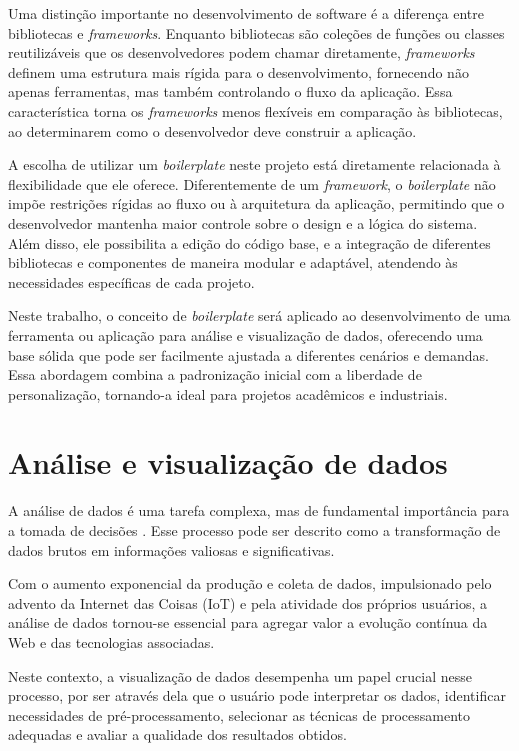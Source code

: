 Uma distinção importante no desenvolvimento de software é a diferença entre bibliotecas e \textit{frameworks}. Enquanto bibliotecas são coleções de funções ou classes reutilizáveis que os desenvolvedores podem chamar diretamente, \textit{frameworks} definem uma estrutura mais rígida para o desenvolvimento, fornecendo não apenas ferramentas, mas também controlando o fluxo da aplicação. Essa característica torna os \textit{frameworks} menos flexíveis em comparação às bibliotecas, ao determinarem como o desenvolvedor deve construir a aplicação.

A escolha de utilizar um \textit{boilerplate} neste projeto está diretamente relacionada à flexibilidade que ele oferece. Diferentemente de um \textit{framework}, o \textit{boilerplate} não impõe restrições rígidas ao fluxo ou à arquitetura da aplicação, permitindo que o desenvolvedor mantenha maior controle sobre o design e a lógica do sistema. Além disso, ele possibilita a edição do código base, e a integração de diferentes bibliotecas e componentes de maneira modular e adaptável, atendendo às necessidades específicas de cada projeto.

Neste trabalho, o conceito de \textit{boilerplate} será aplicado ao desenvolvimento de uma ferramenta ou aplicação para análise e visualização de dados, oferecendo uma base sólida que pode ser facilmente ajustada a diferentes cenários e demandas. Essa abordagem combina a padronização inicial com a liberdade de personalização, tornando-a ideal para projetos acadêmicos e industriais.

\section{Análise e visualização de dados}

A análise de dados é uma tarefa complexa, mas de fundamental importância para a tomada de decisões \citep{guimaraes2004sistema}. Esse processo pode ser descrito como a transformação de dados brutos em informações valiosas e significativas.

Com o aumento exponencial da produção e coleta de dados, impulsionado pelo advento da Internet das Coisas (IoT) e pela atividade dos próprios usuários, a análise de dados tornou-se essencial para agregar valor a evolução contínua da Web e das tecnologias associadas.

Neste contexto, a visualização de dados desempenha um papel crucial nesse processo, por ser através dela que o usuário pode interpretar os dados, identificar necessidades de pré-processamento, selecionar as técnicas de processamento adequadas e avaliar a qualidade dos resultados obtidos.

